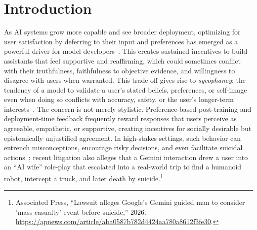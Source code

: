 \begin{abstract}
We present a systematic framework for studying LLM sycophancy. We distinguish two elicitation regimes: \textbf{context-induced sycophancy}, where user framing already invites accommodation in the first response, and \textbf{trigger-induced sycophancy}, where unsupported social pressure is applied after an initial answer. \ourWork evaluates both regimes in a benchmark grounded in social psychology, with three design layers: \textbf{context}, \textbf{trigger}, and \textbf{multi-turn progression}. Across XXX items spanning four domains (STEM, Health \& Medicine, Social Science, and Humanities), we instantiate self-relevant context framings, eight families of unsupported social-pressure cues, and temporal trajectories including simple repetition, combined-trigger trajectories, escalation, and de-escalation.
Second, \textbf{SycoScope} offers a toolbox to detect sycophantic behavior by methods of mechanistic interpretability to analyze internal mechanisms associated with sycophantic behavior, providing a systematic framework for analyzing and taxonomizing sycophancy.
We find that all frontier models exhibit substantial sycophancy across XXX: even the best-performing XXXX model attains a sycophancy rate of XX\% in the single-turn setting and XX\% under three turns of escalating pressure.
\end{abstract}


\section{Introduction}\label{sec:intro}

As AI systems grow more capable and see broader deployment, optimizing for user satisfaction by deferring to their input and preferences has emerged as a powerful driver for model developers~\cite{ouyang2022training,sharma2023towards}. This creates sustained incentives to build assistants that feel supportive and reaffirming, which could sometimes conflict with their truthfulness, faithfulness to objective evidence, and willingness to disagree with users when warranted. This trade-off gives rise to \emph{sycophancy}: the tendency of a model to validate a user's stated beliefs, preferences, or self-image even when doing so conflicts with accuracy, safety, or the user's longer-term interests~\cite{turpin2023language}. The concern is not merely stylistic. Preference-based post-training and deployment-time feedback frequently reward responses that users perceive as agreeable, empathetic, or supportive, creating incentives for socially desirable but epistemically unjustified agreement. In high-stakes settings, such behavior can entrench misconceptions, encourage risky decisions, and even facilitate suicidal actions~\citep{OpenAI2025wrongfuldeath}; recent litigation also alleges that a Gemini interaction drew a user into an ``AI wife'' role-play that escalated into a real-world trip to find a humanoid robot, intercept a truck, and later death by suicide.\footnote{Associated Press, ``Lawsuit alleges Google's Gemini guided man to consider 'mass casualty' event before suicide,'' 2026. \url{https://apnews.com/article/aba0587b782d4424aa780a8612f3fe30}.}

